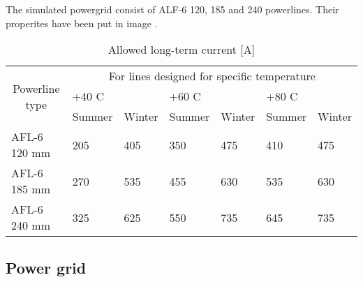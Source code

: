 \documentclass[a4paper]{article}
\begin{document}
The simulated powergrid consist of ALF-6 120, 185  and 240 powerlines. Their properites have been put in image .

\begin{table}[!]
\centering
\caption{Allowed long-term current {[}A{]}}
\label{my-label}
\begin{tabular}{|l|l|l|l|l|l|l|}
\hline
\multicolumn{1}{|c|}{\multirow{3}{*}{Powerline type}} & \multicolumn{6}{c|}{For lines designed for specific temperature}                     \\ \cline{2-7} 
\multicolumn{1}{|c|}{}                                & \multicolumn{2}{l|}{+40 C} & \multicolumn{2}{l|}{+60 C} & \multicolumn{2}{l|}{+80 C} \\ \cline{2-7} 
\multicolumn{1}{|c|}{}                                & Summer       & Winter      & Summer       & Winter      & Summer       & Winter      \\ \hline
AFL-6 120 mm                                          & 205          & 405         & 350          & 475         & 410          & 475         \\ \hline
AFL-6 185 mm                                          & 270          & 535         & 455          & 630         & 535          & 630         \\ \hline
AFL-6 240 mm                                          & 325          & 625         & 550          & 735         & 645          & 735         \\ \hline
\end{tabular}
\end{table}

   

\subsection{Power grid}
\end{document}
